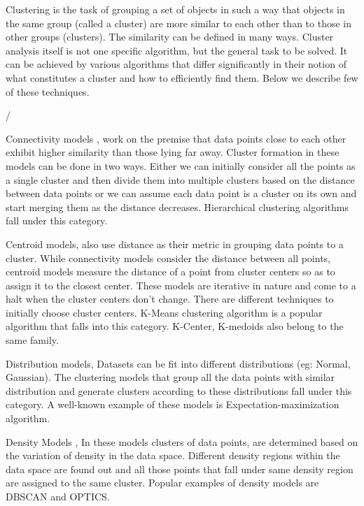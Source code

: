  Clustering is the task of grouping a set of objects in such a way that objects in the same group (called a cluster) are more similar to each other than to those in other groups (clusters). The similarity can be defined in many ways. Cluster analysis itself is not one specific algorithm, but the general task to be solved. It can be achieved by various algorithms that differ significantly in their notion of what constitutes a cluster and how to efficiently find them. Below we describe few of these techniques.

/

Connectivity models \cite{doi:10.1093/comjnl/26.4.354}, work on the premise that data points close to each other exhibit higher similarity than those lying far away. Cluster formation in these models can be done in two ways. Either we can initially consider all the points as a single cluster and then divide them into multiple clusters based on the distance between data points or we can assume each data point is a cluster on its own and start merging them as the distance decreases. Hierarchical clustering algorithms fall under this category.

Centroid models, also use distance as their metric in grouping data points to a cluster. While connectivity models consider the distance between all points, centroid models measure the distance of a point from cluster centers so as to assign it to the closest center. These models are iterative in nature and come to a halt when the cluster centers don't change. There are different techniques to initially choose cluster centers.  K-Means clustering algorithm \cite{Derpanis06k-meansclustering} is a popular algorithm that falls into this category. K-Center, K-medoids also belong to the same family.
 
Distribution models\cite{Johnson2000}, Datasets can be fit into different distributions (eg: Normal, Gaussian). The clustering models that group all the data points with similar distribution and generate clusters according to these distributions fall under this category. A well-known example of these models is Expectation-maximization algorithm. 

Density Models \cite{thang2011anomaly}, In these models clusters of data points, are determined based on the variation of density in the data space. Different density regions within the data space are found out and all those points that fall under same density region are assigned to the same cluster. Popular examples of density models are DBSCAN and OPTICS.


